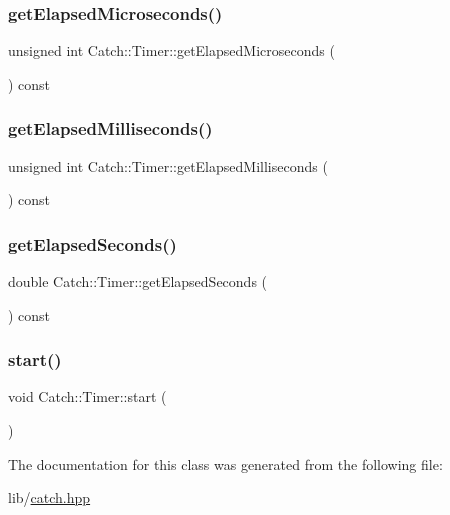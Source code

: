 \subsubsection{\texorpdfstring{get\+Elapsed\+Microseconds()}{getElapsedMicroseconds()}}
{\footnotesize\ttfamily unsigned int Catch\+::\+Timer\+::get\+Elapsed\+Microseconds (\begin{DoxyParamCaption}{ }\end{DoxyParamCaption}) const}

\hypertarget{class_catch_1_1_timer_a2081b2d36950ab6912e7c4958afe0099}{}\label{class_catch_1_1_timer_a2081b2d36950ab6912e7c4958afe0099} 
\subsubsection{\texorpdfstring{get\+Elapsed\+Milliseconds()}{getElapsedMilliseconds()}}
{\footnotesize\ttfamily unsigned int Catch\+::\+Timer\+::get\+Elapsed\+Milliseconds (\begin{DoxyParamCaption}{ }\end{DoxyParamCaption}) const}

\hypertarget{class_catch_1_1_timer_ae1615c8a9aa44b7a96cfe8a35d34e5de}{}\label{class_catch_1_1_timer_ae1615c8a9aa44b7a96cfe8a35d34e5de} 
\subsubsection{\texorpdfstring{get\+Elapsed\+Seconds()}{getElapsedSeconds()}}
{\footnotesize\ttfamily double Catch\+::\+Timer\+::get\+Elapsed\+Seconds (\begin{DoxyParamCaption}{ }\end{DoxyParamCaption}) const}

\hypertarget{class_catch_1_1_timer_a0a56e879e43f36c102bf9ea8b5fc8b72}{}\label{class_catch_1_1_timer_a0a56e879e43f36c102bf9ea8b5fc8b72} 
\subsubsection{\texorpdfstring{start()}{start()}}
{\footnotesize\ttfamily void Catch\+::\+Timer\+::start (\begin{DoxyParamCaption}{ }\end{DoxyParamCaption})}



The documentation for this class was generated from the following file\+:\begin{DoxyCompactItemize}
\item 
lib/\hyperlink{catch_8hpp}{catch.\+hpp}\end{DoxyCompactItemize}
